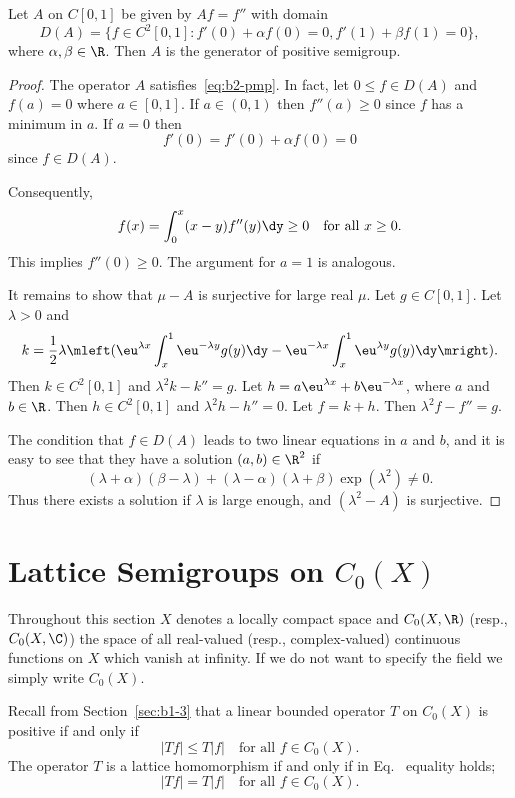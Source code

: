 \begin{example}\label{ex:b2-1.24}
Let $A$ on $C[0,1]$ be given by $Af = f''$ with domain 
\[
D(A) = \{f \in C^{2}[0,1] \colon f'(0) + \alpha f(0) = 0, f'(1) + \beta f(1) = 0\},
\]
where $\alpha,\beta \in \R$.
Then $A$ is the generator of positive semigroup.
\end{example}
\begin{proof}
The operator $A$ satisfies~\eqref{eq:b2-pmp}.
In fact, let $0 \leq f \in D(A)$ and $f(a) = 0$ where $a \in [0,1]$.
If\/ $a \in (0,1)$ then $f''(a) \geq 0$ since $f$ has a minimum in $a$.
If\/ $a = 0$ then 
\[
f'(0) = f'(0) + \alpha f(0) = 0
\]
since $f \in D(A)$.

Consequently, 
%
\[
	f(x) = \int_{0}^{x} (x-y)f''(y) \dy \geq 0 
	\quad \text{for all $x \geq 0$.}
\]
%
This implies $f''(0) \geq 0$.
The argument for $a = 1$ is analogous.

It remains to show that $\mu - A$ is surjective for large real $\mu$.
Let $g \in C[0,1]$.
Let $\lambda > 0$ and 
\[k = \frac{1}{2}\lambda\mleft( \eu^{\lambda x}\int_{x}^{1} \eu^{-\lambda y}g(y)\dy - \eu^{-\lambda x}\int_{x}^{1} \eu^{\lambda y}g(y)\dy \mright).
\]
Then $k \in C^{2}[0,1]$ and $\lambda^{2}k - k'' = g$.
Let $h = a\eu^{\lambda x} + b\eu^{-\lambda x}$, where $a$ and $b \in \R$.
Then $h \in C^{2}[0,1]$ and $\lambda^{2}h - h'' = 0$.
Let $f = k + h$.
Then $\lambda^{2}f - f'' = g$.

The condition that $f \in D(A)$ leads to two linear equations in $a$ and $b$, and it is easy to see that they have a solution $(a,b) \in \R^{2}$ if\/ 
%
\[
	 (\lambda+\alpha)(\beta-\lambda) + (\lambda-\alpha)(\lambda+\beta)\exp(\lambda^{2}) \neq 0 .
\]
%
Thus there exists a solution if\/ $\lambda$ is large enough, and $(\lambda^{2} - A)$ is surjective.
\end{proof}
\section{Lattice Semigroups on  \texorpdfstring{$C_{0}(X)$}{C\textsubscript{0}(X)}}\label{sec:b2-2}%
Throughout this section $X$ denotes a locally compact space and $C_{0}(X,\R)$ (resp., $C_{0}(X,\C)$) the space of all real-valued (resp., complex-valued) continuous functions on $X$ which vanish at infinity.
If we do not want to specify the field we simply write $C_{0}(X)$.

Recall from  Section~\ref{sec:b1-3} that a linear bounded operator $T$ on $C_{0}(X)$ is positive if and only if
\begin{equation}\label{eq:b2-2.1}
|Tf| \leq T|f| \quad \text{for all } f \in C_{0}(X).
\end{equation}
The operator $T$ is a lattice homomorphism if and only if in Eq.~ equality holds; \ie 
\begin{equation}\label{eq:b2-2.2}
|Tf| = T|f| \quad \text{for all } f \in C_{0}(X).
\end{equation}

